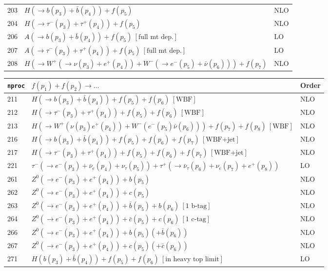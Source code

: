 \documentclass[12pt]{article}
\begin{document}
\begin{itemize}
\begin{table}
\begin{center}
\begin{tabular}{|l|l|l|}
203& $ H(\to b(p_3)+\bar{b}(p_4)) + f(p_5) $ & NLO \\
204& $ H(\to \tau^-(p_3)+\tau^+(p_4)) + f(p_5) $ & NLO \\
206& $ A(\to b(p_3)+\bar{b}(p_4)) + f(p_5) ~[ \mbox{full mt dep.} ] $ & LO \\
207& $ A(\to \tau^-(p_3)+\tau^+(p_4)) + f(p_5) ~[ \mbox{full mt dep.} ] $ & LO \\
208& $ H(\to W^+(\to \nu(p_3)+e^+(p_4))+W^-(\to e^-(p_5)+\bar{\nu}(p_6)))+f(p_7)$ & NLO \\
\hline 
\end{tabular}
\end{center}
\end{table}
\begin{table}
\begin{center}
\hspace*{-1.5cm}
\begin{tabular}{|l|l|l|}
\hline
{\tt nproc} & $ f(p_1)+f(p_2) \to \ldots $& Order \\ 
\hline 
211& $ H(\to b(p_3)+\bar{b}(p_4))+f(p_5)+f(p_6) ~[ \mbox{WBF} ] $ & NLO \\
212& $ H(\to \tau^-(p_3)+\tau^+(p_4))+f(p_5)+f(p_6) ~[ \mbox{WBF} ] $ & NLO \\
213& $ H(\to W^+(\nu(p_3) e^+(p_4)) + W^-(e^-(p_5) \bar{\nu}(p_6)))+f(p_7)+f(p_8) ~[ \mbox{WBF} ] $ & NLO \\
216& $ H(\to b(p_3)+\bar{b}(p_4))+f(p_5)+f(p_6)+f(p_7) ~[ \mbox{WBF+jet} ] $ & NLO \\
217& $ H(\to \tau^-(p_3)+\tau^+(p_4))+f(p_5)+f(p_6)+f(p_7) ~[ \mbox{WBF+jet} ] $ & NLO \\
\hline 
221& $ \tau^-(\to e^-(p_3)+\bar{\nu}_e(p_4)+\nu_\tau(p_5))+\tau^+(\to \bar{\nu}_\tau(p_6)+\nu_e(p_7)+e^+(p_8)) $ & LO \\
\hline
261& $ Z^0(\to e^-(p_3)+e^+(p_4))+b(p_5) $ & NLO \\
262& $ Z^0(\to e^-(p_3)+e^+(p_4))+c(p_5) $ & NLO \\
263& $ Z^0(\to e^-(p_3)+e^+(p_4))+\bar{b}(p_5)+b(p_6) ~[ \mbox{1 b-tag} ] $ & NLO \\
264& $ Z^0(\to e^-(p_3)+e^+(p_4))+\bar{c}(p_5)+c(p_6) ~[ \mbox{1 c-tag} ] $ & NLO \\
266& $ Z^0(\to e^-(p_3)+e^+(p_4))+b(p_5)(+\bar{b}(p_6)) $ & NLO \\
267& $ Z^0(\to e^-(p_3)+e^+(p_4))+c(p_5)(+\bar{c}(p_6)) $ & NLO \\
\hline 
271& $ H(b(p_3)+\bar{b}(p_4))+f(p_5)+f(p_6)~[ \mbox{in heavy top limit} ] $ & LO \\

\end{tabular}
\end{center}
\end{table}
\end{itemize}
\end{document}
